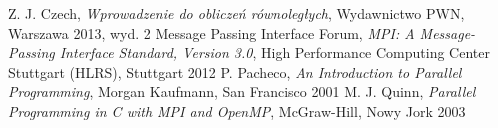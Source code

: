 
	

\begin{thebibliography}{2}
	
	 Z. J. Czech, \textit{Wprowadzenie do obliczeń równoległych}, Wydawnictwo PWN, Warszawa 2013, wyd. 2
	 Message Passing Interface Forum, \textit{MPI: A Message-Passing Interface Standard, Version 3.0}, High Performance Computing Center Stuttgart (HLRS), Stuttgart 2012
	 P. Pacheco, \textit{An Introduction to Parallel Programming}, Morgan Kaufmann, San Francisco 2001
	 M. J. Quinn, \textit{Parallel Programming in C with MPI and OpenMP}, McGraw-Hill, Nowy Jork 2003
	
\end{thebibliography}